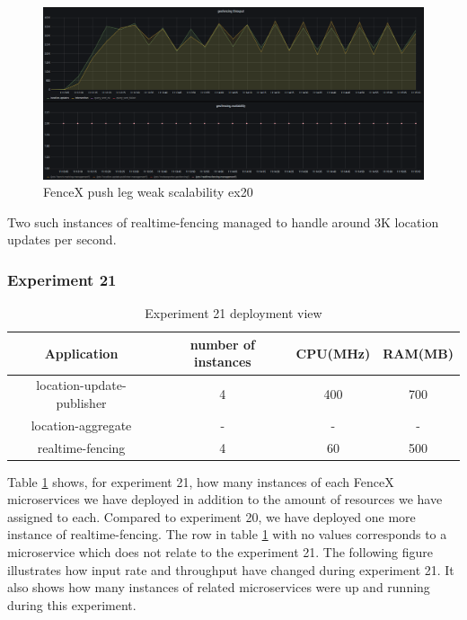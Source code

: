 \documentclass[a4]{report}
\begin{document}
    \begin{figure}
        \caption{FenceX push leg weak scalability ex20}
        \label{fig:ex20}
        \includegraphics[scale=0.5]{images/evaluation/ex20-benchmarking-ongoing-1per10sec.png}
    \end{figure}

    \clearpage

    Two such instances of realtime-fencing managed to handle around 3K location updates per second.

    \subsubsection{Experiment 21}
    \begin{table}[h!]
        \centering
        \begin{tabular}{|c|c|c|c|}
            \hline
            Application               & number of instances & CPU(MHz) & RAM(MB) \\
            \hline
            location-update-publisher & 4                   & 400      & 700     \\
            location-aggregate        & -                   & -        & -       \\
            realtime-fencing          & 4                   & 60       & 500     \\
            \hline
        \end{tabular}
        \caption{Experiment 21 deployment view}
        \label{table:ex21-dv}
    \end{table}

    Table \ref{table:ex21-dv} shows, for experiment 21, how many instances of each FenceX microservices we have
    deployed in addition to the amount of resources we have assigned to each.
    Compared to experiment 20, we have deployed one more instance of realtime-fencing.
    The row in table \ref{table:ex21-dv} with no values corresponds to a microservice which does not relate to the
    experiment 21.
    The following figure illustrates how input rate and throughput have changed during experiment 21.
    It also shows how many instances of related microservices were up and running during this experiment.
\end{document}
